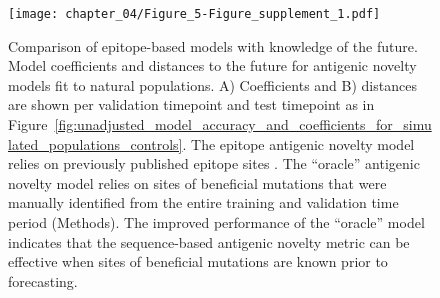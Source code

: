 \begin{figure}
  \texttt{[image: chapter\_04/Figure\_5-Figure\_supplement\_1.pdf]}
  \caption{
    Comparison of epitope-based models with knowledge of the future.
    Model coefficients and distances to the future for antigenic novelty models fit to natural populations.
    A) Coefficients and B) distances are shown per validation timepoint and test timepoint as in Figure~\ref{fig:unadjusted_model_accuracy_and_coefficients_for_simulated_populations_controls}.
    The epitope antigenic novelty model relies on previously published epitope sites \citep{Luksza:2014hj}.
    The ``oracle'' antigenic novelty model relies on sites of beneficial mutations that were manually identified from the entire training and validation time period (Methods).
    The improved performance of the ``oracle'' model indicates that the sequence-based antigenic novelty metric can be effective when sites of beneficial mutations are known prior to forecasting.
  }
  \label{fig:unadjusted_composite_model_accuracy_and_coefficients_for_natural_populations_epitope_vs_oracle}
\end{figure}

